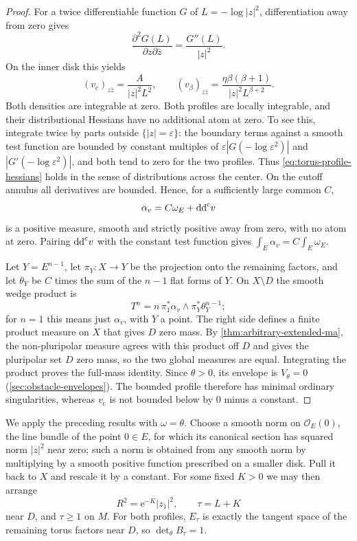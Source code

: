 \begin{proof}
For a twice differentiable function $G$ of $L=-\log|z|^2$, differentiation away from zero gives
\[
 \frac{\partial^2G(L)}{\partial z\partial\bar z}
 =\frac{G''(L)}{|z|^2}.
\]
On the inner disk this yields
\begin{equation}\label{eq:torus-profile-hessians}
 (v_{\mathrm c})_{z\bar z}=\frac{A}{|z|^2L^2},\qquad
 (v_\beta)_{z\bar z}=\frac{\eta\beta(\beta+1)}{|z|^2L^{\beta+2}}.
\end{equation}
Both densities are integrable at zero. Both profiles are locally integrable, and their distributional Hessians have no additional atom at zero. To see this, integrate twice by parts outside $\{|z|=\varepsilon\}$: the boundary terms against a smooth test function are bounded by constant multiples of
$\varepsilon|G(-\log\varepsilon^2)|$ and $|G'(-\log\varepsilon^2)|$, and both tend to zero for the two profiles. Thus \eqref{eq:torus-profile-hessians} holds in the sense of distributions across the center. On the cutoff annulus all derivatives are bounded. Hence, for a sufficiently large common $C$,
\[
 \alpha_v=C\omega_E+\mathrm{dd}^{\mathrm{c}} v
\]
is a positive measure, smooth and strictly positive away from zero, with no atom at zero. Pairing $\mathrm{dd}^{\mathrm{c}} v$ with the constant test function gives
$\int_E\alpha_v=C\int_E\omega_E$.

Let $Y=E^{n-1}$, let $\pi_Y\colon X\to Y$ be the projection onto the remaining factors, and let $\theta_Y$ be $C$ times the sum of the $n-1$ flat forms of $Y$. On $X\setminus D$ the smooth wedge product is
\[
 T^n=n\,\pi_1^*\alpha_v\wedge\pi_Y^*\theta_Y^{n-1};
\]
for $n=1$ this means just $\alpha_v$, with $Y$ a point. The right side defines a finite product measure on $X$ that gives $D$ zero mass. By \cref{thm:arbitrary-extended-ma}, the non-pluripolar measure agrees with this product off $D$ and gives the pluripolar set $D$ zero mass, so the two global measures are equal. Integrating the product proves the full-mass identity. Since $\theta>0$, its envelope is $V_\theta=0$ (\cref{sec:obstacle-envelopes}). The bounded profile therefore has minimal ordinary singularities, whereas $v_{\mathrm c}$ is not bounded below by $0$ minus a constant.
\end{proof}

We apply the preceding results with $\omega=\theta$. Choose a smooth norm on $\mathcal O_E(0)$, the line bundle of the point $0\in E$, for which its canonical section has squared norm $|z|^2$ near zero; such a norm is obtained from any smooth norm by multiplying by a smooth positive function prescribed on a smaller disk. Pull it back to $X$ and rescale it by a constant. For some fixed $K>0$ we may then arrange
\[
 R^2=\mathrm{e}^{-K}|z_1|^2,\qquad \tau=L+K
\]
near $D$, and $\tau\geq1$ on $M$. For both profiles, $E_\tau$ is exactly the tangent space of the remaining torus factors near $D$, so $\det_\theta B_\tau=1$.

